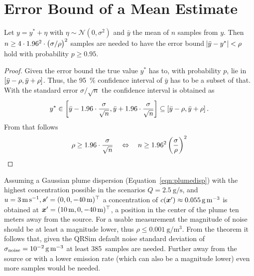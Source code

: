 \chapter{Error Bound of a Mean Estimate}\label{sec:decnoise}
\begin{theorem}
    Let $y = y^* + \eta$ with $\eta \sim \mathcal N(0, \sigma^2)$ and $\bar y$ 
    the mean of $n$ samples from $y$. Then $n \geq 4 \cdot 1.96^2 \cdot 
    \del{\sigma / \rho}^2$ samples are needed to have the error bound 
    $\abs{\bar{y} - y^*} < \rho$ hold with probability $p \geq 0.95$.
\end{theorem}

\begin{proof}
    Given the error bound the true value $y^*$ has to, with probability $p$, lie 
    in $\intcc{\bar y - \rho, \bar y + \rho}$. Thus, the \SI{95}{\percent} 
    confidence interval of $\bar y$ has to be a subset of that. With the 
    standard error $\sigma / \sqrt{n}$ the confidence interval is obtained as
    \begin{equation*}
        y^* \in \intcc{\bar y - 1.96 \cdot \frac{\sigma}{\sqrt{n}}, \bar{y} 
            + 1.96 \cdot \frac{\sigma}{\sqrt{n}}} \subseteq \intcc{\bar{y} 
            - \rho, \bar y + \rho} \text{.}
    \end{equation*}
    From that follows
    \begin{equation*}
        \rho \geq 1.96 \cdot \frac{\sigma}{\sqrt{n}} \quad\Leftrightarrow\quad 
        n \geq 
        1.96^2 \del{\frac{\sigma}{\rho}}^2
    \end{equation*}
\end{proof}

Assuming a Gaussian plume dispersion (Equation~\ref{eqn:plumedisp}) with the 
highest concentration possible in the scenarios $Q 
= \SI{2.5}{\gram\per\second}$, and
$u = \SI{3}{\meter\per\second}, \bm{s}' = (0, 0, \SI{-40}{\meter})^{\top}$ 
a concentration of $c(\bm{x}') \approx \SI{0.055}{\gram\per\meter\cubed}$ is 
obtained at $\bm{x}' = (\SI{10}{\meter}, 0, \SI{-40}{\meter})^{\top}$, a position in 
the center of the plume ten meters away from the source. For a usable 
measurement the magnitude of noise should be at least a magnitude lower, thus 
$\rho \leq \SI{0.001}{\gram\per\meter\cubed}$. From the theorem it follows that, 
given the QRSim default noise standard deviation of $\sigma_{\mathrm{noise}} 
= \SI{e-2}{\gram\per\meter\cubed}$ at least 385~samples are needed. Further away 
from the source or with a lower emission rate (which can also be a magnitude 
lower) even more samples would be needed.

